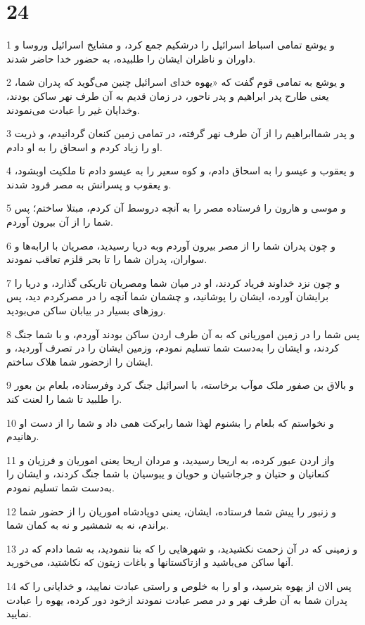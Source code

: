 \chapter{24}

\par 1 و یوشع تمامی اسباط اسرائیل را درشکیم جمع کرد، و مشایخ اسرائیل وروسا و داوران و ناظران ایشان را طلبیده، به حضور خدا حاضر شدند.
\par 2 و یوشع به تمامی قوم گفت که «یهوه خدای اسرائیل چنین می‌گوید که پدران شما، یعنی طارح پدر ابراهیم و پدر ناحور، در زمان قدیم به آن طرف نهر ساکن بودند، وخدایان غیر را عبادت می‌نمودند.
\par 3 و پدر شماابراهیم را از آن طرف نهر گرفته، در تمامی زمین کنعان گردانیدم، و ذریت او را زیاد کردم و اسحاق را به او دادم.
\par 4 و یعقوب و عیسو را به اسحاق دادم، و کوه سعیر را به عیسو دادم تا ملکیت اوبشود، و یعقوب و پسرانش به مصر فرود شدند.
\par 5 و موسی و هارون را فرستاده مصر را به آنچه دروسط آن کردم، مبتلا ساختم؛ پس شما را از آن بیرون آوردم.
\par 6 و چون پدران شما را از مصر بیرون آوردم وبه دریا رسیدید، مصریان با ارابه‌ها و سواران، پدران شما را تا بحر قلزم تعاقب نمودند.
\par 7 و چون نزد خداوند فریاد کردند، او در میان شما ومصریان تاریکی گذارد، و دریا را برایشان آورده، ایشان را پوشانید، و چشمان شما آنچه را در مصرکردم دید، پس روزهای بسیار در بیابان ساکن می‌بودید.
\par 8 پس شما را در زمین اموریانی که به آن طرف اردن ساکن بودند آوردم، و با شما جنگ کردند، و ایشان را به‌دست شما تسلیم نمودم، وزمین ایشان را در تصرف آوردید، و ایشان را ازحضور شما هلاک ساختم.
\par 9 و بالاق بن صفور ملک موآب برخاسته، با اسرائیل جنگ کرد وفرستاده، بلعام بن بعور را طلبید تا شما را لعنت کند.
\par 10 و نخواستم که بلعام را بشنوم لهذا شما رابرکت همی داد و شما را از دست او رهانیدم.
\par 11 واز اردن عبور کرده، به اریحا رسیدید، و مردان اریحا یعنی اموریان و فرزیان و کنعانیان و حتیان و جرجاشیان و حویان و یبوسیان با شما جنگ کردند، و ایشان را به‌دست شما تسلیم نمودم.
\par 12 و زنبور را پیش شما فرستاده، ایشان، یعنی دوپادشاه اموریان را از حضور شما براندم، نه به شمشیر و نه به کمان شما.
\par 13 و زمینی که در آن زحمت نکشیدید، و شهرهایی را که بنا ننمودید، به شما دادم که در آنها ساکن می‌باشید و ازتاکستانها و باغات زیتون که نکاشتید، می‌خورید.
\par 14 پس الان از یهوه بترسید، و او را به خلوص و راستی عبادت نمایید، و خدایانی را که پدران شما به آن طرف نهر و در مصر عبادت نمودند ازخود دور کرده، یهوه را عبادت نمایید.
